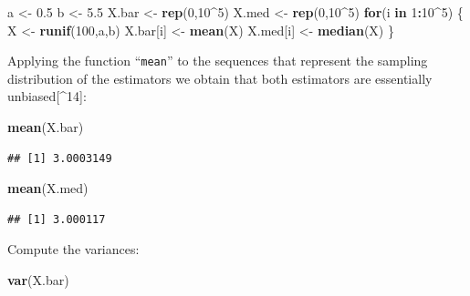 \documentclass[]{krantz}
\makeatletter
\newenvironment{Shaded}{\begin{snugshade}}{\end{snugshade}}
\newcommand{\ControlFlowTok}[1]{\textcolor[rgb]{0.13,0.29,0.53}{\textbf{#1}}}
\newcommand{\DecValTok}[1]{\textcolor[rgb]{0.00,0.00,0.81}{#1}}
\newcommand{\FloatTok}[1]{\textcolor[rgb]{0.00,0.00,0.81}{#1}}
\newcommand{\KeywordTok}[1]{\textcolor[rgb]{0.13,0.29,0.53}{\textbf{#1}}}
\newcommand{\NormalTok}[1]{#1}
\newcommand{\OperatorTok}[1]{\textcolor[rgb]{0.81,0.36,0.00}{\textbf{#1}}}
\newcommand{\StringTok}[1]{\textcolor[rgb]{0.31,0.60,0.02}{#1}}
\newenvironment{kframe}{%
\medskip{}
\setlength{\fboxsep}{.8em}
 \def\at@end@of@kframe{}%
 \ifinner\ifhmode%
  \def\at@end@of@kframe{\end{minipage}}%
  \begin{minipage}{\columnwidth}%
 \fi\fi%
 \def\FrameCommand##1{\hskip\@totalleftmargin \hskip-\fboxsep
 \colorbox{shadecolor}{##1}\hskip-\fboxsep
     \hskip-\linewidth \hskip-\@totalleftmargin \hskip\columnwidth}%
 \MakeFramed {\advance\hsize-\width
   \@totalleftmargin\z@ \linewidth\hsize
   \@setminipage}}%
 {\par\unskip\endMakeFramed%
 \at@end@of@kframe}
\renewenvironment{Shaded}{\begin{kframe}}{\end{kframe}}
\theoremstyle{definition}
\theoremstyle{definition}
\theoremstyle{definition}
\theoremstyle{remark}
\makeatother
\begin{document}
\begin{enumerate}
\begin{Shaded}
\begin{Highlighting}[]
\NormalTok{a <-}\StringTok{ }\FloatTok{0.5}
\NormalTok{b <-}\StringTok{ }\FloatTok{5.5}
\NormalTok{X.bar <-}\StringTok{ }\KeywordTok{rep}\NormalTok{(}\DecValTok{0}\NormalTok{,}\DecValTok{10}\OperatorTok{^}\DecValTok{5}\NormalTok{)}
\NormalTok{X.med <-}\StringTok{ }\KeywordTok{rep}\NormalTok{(}\DecValTok{0}\NormalTok{,}\DecValTok{10}\OperatorTok{^}\DecValTok{5}\NormalTok{)}
\ControlFlowTok{for}\NormalTok{(i }\ControlFlowTok{in} \DecValTok{1}\OperatorTok{:}\DecValTok{10}\OperatorTok{^}\DecValTok{5}\NormalTok{) \{}
\NormalTok{  X <-}\StringTok{ }\KeywordTok{runif}\NormalTok{(}\DecValTok{100}\NormalTok{,a,b)}
\NormalTok{  X.bar[i] <-}\StringTok{ }\KeywordTok{mean}\NormalTok{(X)}
\NormalTok{  X.med[i] <-}\StringTok{ }\KeywordTok{median}\NormalTok{(X)}
\NormalTok{\}}
\end{Highlighting}
\end{Shaded}

  Applying the function ``\texttt{mean}'' to the sequences that represent the
  sampling distribution of the estimators we obtain that both estimators
  are essentially unbiased{[}\^{}14{]}:

\begin{Shaded}
\begin{Highlighting}[]
\KeywordTok{mean}\NormalTok{(X.bar)}
\end{Highlighting}
\end{Shaded}

\begin{verbatim}
## [1] 3.0003149
\end{verbatim}

\begin{Shaded}
\begin{Highlighting}[]
\KeywordTok{mean}\NormalTok{(X.med)}
\end{Highlighting}
\end{Shaded}

\begin{verbatim}
## [1] 3.000117
\end{verbatim}

  Compute the variances:

\begin{Shaded}
\begin{Highlighting}[]
\KeywordTok{var}\NormalTok{(X.bar)}
\end{Highlighting}
\end{Shaded}


\end{enumerate}
\end{document}
